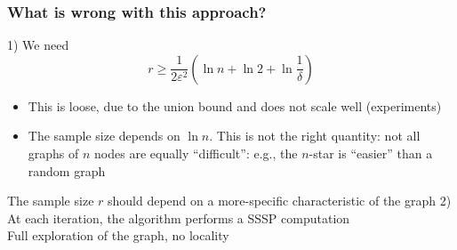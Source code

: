 %

\begin{frame}
  \frametitle{What is wrong with this approach?}
  1) We need
  \[
    r\ge\frac{1}{2\varepsilon^2}\left(\ln n + \ln 2 +
    \ln\frac{1}{\delta}\right)
  \]
  \begin{itemize}
    \item This is loose, due to the union bound and does not scale well (experiments)
    \item The sample size depends on $\ln n$. This is not the right
      quantity: not all graphs of $n$ nodes are equally ``difficult'': e.g., the $n$-star is ``easier'' than a random graph
  \end{itemize}
  The sample size $r$ should depend on a more-specific characteristic of the graph
  \vfill
  2) At each iteration, the algorithm performs a SSSP computation\\
  \quad Full exploration of the graph, no locality
\end{frame}

